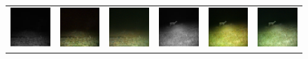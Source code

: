 \begin{figure}[htp!]
\begin{tabularx}{\textwidth}{Y Y Y !{\space} Y Y Y}
        \includegraphics{gfx/diffusion-sampling-full-vs-high-pass-filter-qual/nir_S2_B06_R3_PICT3848.jpg} & \includegraphics{gfx/diffusion-sampling-full-vs-high-pass-filter-qual/full-pass_S2_B06_R3_PICT3848.png} & \includegraphics{gfx/diffusion-sampling-full-vs-high-pass-filter-qual/high-pass_S2_B06_R3_PICT3848.png} & \includegraphics{gfx/diffusion-sampling-full-vs-high-pass-filter-qual/nir_S2_B07_R1_PICT3274.jpg} & \includegraphics{gfx/diffusion-sampling-full-vs-high-pass-filter-qual/full-pass_S2_B07_R1_PICT3274.png} & \includegraphics{gfx/diffusion-sampling-full-vs-high-pass-filter-qual/high-pass_S2_B07_R1_PICT3274.png}
    \end{tabularx}
    \caption{
    }
    \label{fig:qualitative-evaluation-full-high-pass}
\end{figure}

